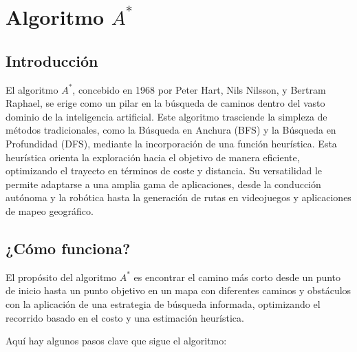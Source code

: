 \section{Algoritmo $A^{*}$}

\subsection*{Introducción}

El algoritmo $A^{*}$, concebido en 1968 por Peter Hart, Nils Nilsson, y Bertram Raphael, se erige como 
un pilar en la búsqueda de caminos dentro del vasto dominio de la inteligencia artificial. Este 
algoritmo trasciende la simpleza de métodos tradicionales, como la Búsqueda en Anchura (BFS) y la 
Búsqueda en Profundidad (DFS), mediante la incorporación de una función heurística. Esta heurística 
orienta la exploración hacia el objetivo de manera eficiente, optimizando el trayecto en términos de 
coste y distancia. Su versatilidad le permite adaptarse a una amplia gama de aplicaciones, desde la 
conducción autónoma y la robótica hasta la generación de rutas en videojuegos y aplicaciones de mapeo 
geográfico.

\subsection*{¿Cómo funciona?}

El propósito del algoritmo \(A^*\) es encontrar el camino más corto desde un punto de inicio hasta un 
punto objetivo en un mapa con diferentes caminos y obstáculos con la aplicación de una estrategia de 
búsqueda informada, optimizando el recorrido basado en el costo y una estimación heurística. 

Aquí hay algunos pasos clave que sigue el algoritmo:


